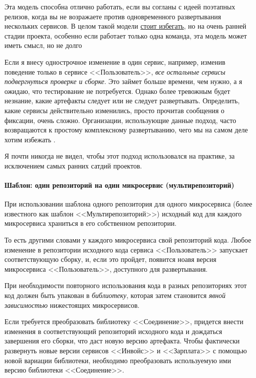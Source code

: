 \documentclass[%
	11pt,
	a4paper,
	utf8,
		]{article}
\begin{document}
Эта модель способна отлично работать, если вы согланы с идеей поэтапных релизов, когда вы не возражаете против одновременного развертывания нескольких сервисов. {\color{red} В целом такой модели \underline{стоит избегать}, но на очень ранней стадии проекта, особенно если работает только одна команда, эта модель может иметь смысл, но не долго}

Если я внесу однострочное изменение в один сервис, например, изменив поведение только в сервисе <<Пользователь>>, \emph{\color{red}все остальные сервисы подвергнуться проверке и сборке}. Это займет больше времени, чем нужно, а я ожидаю, что тестирование не потребуется. Однако более тревожным будет незнание, какие артефакты следует или не следует развертывать. Определить, какие сервисы действительно изменились, просто прочитав сообщения о фиксации, очень сложно. Организации, использующие данные подход, часто возвращаются к простому комплексному развертыванию, чего мы на самом деле хотим избежать \cite[]{microservices-2024}.

Я почти никогда не видел, чтобы этот подход использовался на практике, за исключением самых ранних сатдий проектов.

\paragraph{Шаблон: один репозиторий на один микросервис (мультирепозиторий)} При использовании шаблона одного репозитория для одного микросервиса (более известного как шаблон <<Мультирепозиторий>>) {\color{blue}исходный код для каждого микросервиса храниться в его собственном репозитории}. 

То есть другими словами у каждого микросервиса свой репозиторий кода. Любое изменение в репозитории исходного кода сервиса <<Пользователь>> запускает соответствующую сборку, и, если это пройдет, появится ноавя версия микросервиса <<Пользователь>>, доступного для развертывания.

При необходимости повторного использования кода в разных репозиториях этот код должен быть упакован в \emph{библиотеку}, которая затем становится \emph{явной зависимостью} нижестоящих микросервисов.

Если требуется преобразовать библиотеку <<Соединение>>, придется внести изменения в соответствующий репозиторий исходного кода и дождаться завершения его сборки, что даст новую версию артефакта. Чтобы фактически развернуть новые версии сервисов <<Инвойс>> и <<Зарплата>> с помощью новой вариации библиотеки, необходимо преобразовать используемую ими версию библиотеки <<Соединение>>.
\end{document}
